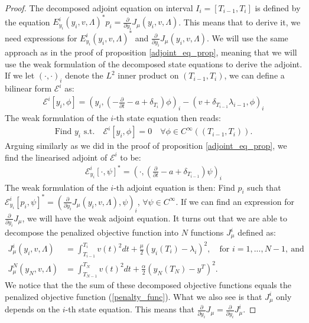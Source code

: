\begin{proof}
The decomposed adjoint equation on interval $I_i= [T_{i-1},T_{i}]$ is defined by the equation $E^i_{y_i}(y_i,v,\Lambda)^*p_i=\frac{\partial}{\partial y_i}J_{\mu}(y_i,v,\Lambda)$. This means that to derive it, we need expressions for $E^i_{y_i}(y_i,v,\Lambda)^*$ and $\frac{\partial}{\partial y_i}J_{\mu}(y_i,v,\Lambda)$. We will use the same approach as in the proof of proposition \ref{adjoint_eq_prop}, meaning that we will use the weak formulation of the decomposed state equations to derive the adjoint. If we let $(\cdot,\cdot)_i$ denote the $L^2$ inner product on $(T_{i-1},T_i)$, we can define a bilinear form $\mathcal{E}^i$ as:
\begin{align*}
\mathcal{E}^i[y_i,\phi]=(y_i,(-\frac{\partial}{\partial t}-a+\delta_{T_i})\phi)_i - (v+\delta_{T_{i-1}}\lambda_{i-1},\phi)_i
\end{align*}
The weak formulation of the $i$-th state equation then reads:
\begin{align*}
\textrm{Find $y_i$ s.t.}\quad \mathcal{E}^i[y_i,\phi]=0 \quad \forall \phi\in C^{\infty}((T_{i-1},T_i)).
\end{align*}
Arguing similarly as we did in the proof of proposition \ref{adjoint_eq_prop}, we find the linearised adjoint of $\mathcal{E}^i$ to be:
\begin{align*}
\mathcal{E}_{y_i}^i[\cdot,\psi]^* = (\cdot,(\frac{\partial}{\partial t}-a+\delta_{T_{i-1}})\psi)_i
\end{align*}
The weak formulation of the $i$-th adjoint equation is then: Find $p_i$ such that $\mathcal{E}_{y_i}^i[p_i,\psi]^*=(\frac{\partial}{\partial y_i}J_{\mu}(y_i,v,\Lambda),\psi)_i$, $\forall\psi \in C^{\infty}$. If we can find an expression for $\frac{\partial}{\partial y_i}J_{\mu}$, we will have the weak adjoint equation. It turns out that we are able to decompose the penalized objective function into $N$ functions $J_{\mu}^i$ defined as:
\begin{align*}
J_{\mu}^i(y_i,v,\Lambda)& = \int_{T_{i-1}}^{T_i} v(t)^2 dt + \frac{\mu }{2}(y_i(T_i)-\lambda_i)^2, \quad \textrm{for }i=1,...,N-1,\ \textrm{and}\\
J_{\mu}^N(y_N,v,\Lambda) &= \int_{T_{N-1}}^{T_N} v(t)^2 dt + \frac{\alpha }{2}(y_N(T_N)-y^T)^2.
\end{align*}
We notice that the the sum of these decomposed objective functions equals the penalized objective function (\ref{penalty_func}). What we also see is that $J_{\mu}^i$ only depends on the $i$-th state equation. This means that $\frac{\partial}{\partial y_i}J_{\mu}=\frac{\partial}{\partial y_i}J_{\mu}^i$.

\end{proof}

